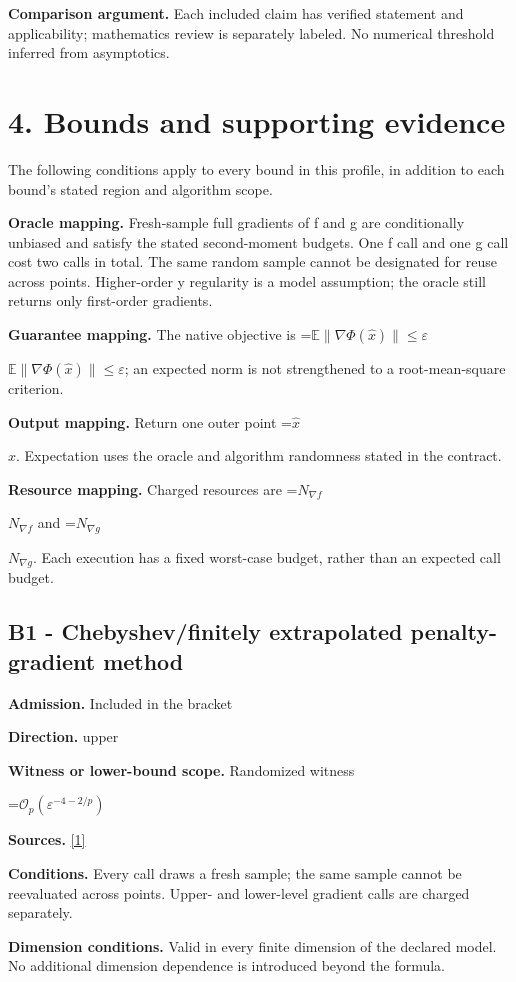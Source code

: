 \documentclass[10pt,a4paper]{article}
\newcommand{\AtlasMath}[1]{\par\begingroup\centering\setbox0=\hbox{$\displaystyle #1$}\ifdim\wd0>1.4\linewidth\typeout{ATLAS WIDE FORMULA: \the\wd0}\fi\ifdim\wd0>\linewidth\resizebox{\linewidth}{!}{\box0}\else\box0\fi\par\endgroup}
\newcommand{\AtlasInlineMath}[1]{\begingroup\setbox0=\hbox{$#1$}\ifdim\wd0>.4\linewidth\endgroup\AtlasMath{#1}\else\endgroup$#1$\fi}
\begin{document}
\textbf{Comparison argument.} Each included claim has verified statement and applicability; mathematics review is separately labeled. No numerical threshold inferred from asymptotics.

\section{4. Bounds and supporting evidence}
The following conditions apply to every bound in this profile, in addition to each bound's stated region and algorithm scope.

\textbf{Oracle mapping.} Fresh-sample full gradients of f and g are conditionally unbiased and satisfy the stated second-moment budgets. One f call and one g call cost two calls in total. The same random sample cannot be designated for reuse across points. Higher-order y regularity is a model assumption; the oracle still returns only first-order gradients.

\textbf{Guarantee mapping.} The native objective is \AtlasInlineMath{\mathbb E\|\nabla\Phi(\widehat x)\|\le\varepsilon}; an expected norm is not strengthened to a root-mean-square criterion.

\textbf{Output mapping.} Return one outer point \AtlasInlineMath{\widehat x}. Expectation uses the oracle and algorithm randomness stated in the contract.

\textbf{Resource mapping.} Charged resources are \AtlasInlineMath{N_{\nabla f}} and \AtlasInlineMath{N_{\nabla g}}. Each execution has a fixed worst-case budget, rather than an expected call budget.

\subsection{B1 - Chebyshev/finitely extrapolated penalty-gradient method}
\textbf{Admission.} Included in the bracket

\textbf{Direction.} upper

\textbf{Witness or lower-bound scope.} Randomized witness

\AtlasMath{\mathcal{O}_p(\varepsilon^{-4-2/p})}
\textbf{Sources.} \href{https://arxiv.org/pdf/2610.03638v2}{[1]}

\textbf{Conditions.} Every call draws a fresh sample; the same sample cannot be reevaluated across points. Upper- and lower-level gradient calls are charged separately.

\textbf{Dimension conditions.} Valid in every finite dimension of the declared model. No additional dimension dependence is introduced beyond the formula.
\end{document}
